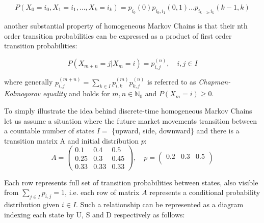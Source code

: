 \begin{equation}
P(X_{0}=i_0,X_{1}=i_1,\ldots,X_{k}=i_k) = p_{i_0}(0) p_{i_0,i_1}(0,1) \ldots p_{i_{k-1},i_k}(k-1,k)
\end{equation}

another substantial property of homogeneous Markov Chains is that their nth order transition probabilities can be expressed as a product of first order transition probabilities:

\begin{equation}
P(X_{m+n} = j|X_{m} = i) = p_{i,j}^{(n)}, \quad i,j \in I
\end{equation}

where generally $p_{i,j}^{(m+n)} = \sum_{k \in I} p_{i,k}^{(m)} p_{k,j}^{(n)}$ is referred to as {\it Chapman-Kolmogorov equality} and holds for $m,n \in \mathbb{N}_0$ and $P(X_m=i) \geq 0$.


To simply illustrate the idea behind discrete-time homogeneous Markov Chains let us assume a situation where the future market movements transition between a countable number of states $I =$ \{upward, side, downward\} 
and there is a transition matrix A and initial distribution $p$:
\begin{equation}
A =
\begin{pmatrix}
0.1 & 0.4 & 0.5 \\
0.25 & 0.3 & 0.45 \\
0.33 & 0.33 & 0.33 
\end{pmatrix} 
, \quad p = 
\begin{pmatrix}
    0.2 & 0.3 & 0.5 \\
\end{pmatrix}
\end{equation}



Each row represents full set of transition probabilities between states, also visible from $\sum_{j \in I} ^{}p_{i,j} = 1 $, i.e. each row of matrix $A$ represents a conditional probability distribution given $i \in I$. 
Such a relationship can be represented as a diagram indexing each state by U, S and D respectively as follows:

\begin{center}
\end{center}


